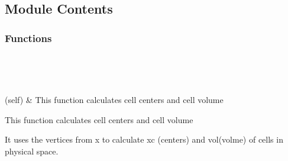 \documentclass[letterpaper,10pt,english]{sphinxmanual}
\begin{document}
\subsection{Module Contents}
\label{\detokenize{autoapi/metric_func/index:module-contents}}

\subsubsection{Functions}
\label{\detokenize{autoapi/metric_func/index:functions}}

\begin{savenotes}\sphinxatlongtablestart\begin{longtable}[c]{}
\hline

\endfirsthead

%
{}\\
\hline

\endhead

\hline
{}\\
\endfoot

\endlastfoot

\sphinxAtStartPar
{\hyperref[\detokenize{autoapi/metric_func/index:metric_func.metric}]{}}(self)
&
\sphinxAtStartPar
This function calculates cell centers and cell volume
\\
\hline
\end{longtable}\sphinxatlongtableend\end{savenotes}

\begin{fulllineitems}
\label{\detokenize{autoapi/metric_func/index:metric_func.metric}}
\sphinxAtStartPar
This function calculates cell centers and cell volume

\sphinxAtStartPar
It uses the vertices from x to calculate xc (centers) and vol(volme)
of cells in physical space.

\end{fulllineitems}
\end{document}
